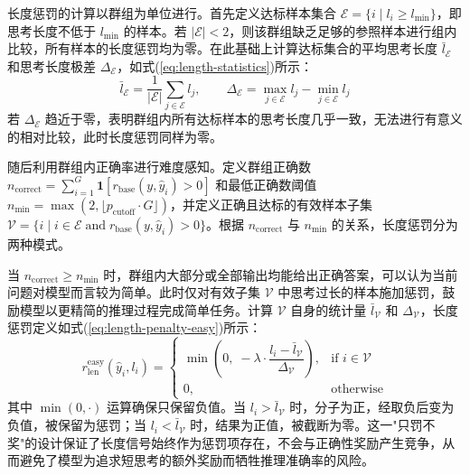 长度惩罚的计算以群组为单位进行。首先定义达标样本集合 $\mathcal{E} = \{i \mid l_i \geq l_{\min}\}$，即思考长度不低于 $l_{\min}$ 的样本。若 $|\mathcal{E}| < 2$，则该群组缺乏足够的参照样本进行组内比较，所有样本的长度惩罚均为零。在此基础上计算达标集合的平均思考长度 $\bar{l}_{\mathcal{E}}$ 和思考长度极差 $\Delta_{\mathcal{E}}$，如式(\ref{eq:length-statistics})所示：
\begin{equation}\label{eq:length-statistics}
  \bar{l}_{\mathcal{E}} = \frac{1}{|\mathcal{E}|}\sum_{j \in \mathcal{E}} l_j, \qquad
  \Delta_{\mathcal{E}} = \max_{j \in \mathcal{E}} l_j - \min_{j \in \mathcal{E}} l_j
\end{equation}
若 $\Delta_{\mathcal{E}}$ 趋近于零，表明群组内所有达标样本的思考长度几乎一致，无法进行有意义的相对比较，此时长度惩罚同样为零。

随后利用群组内正确率进行难度感知。定义群组正确数 $n_{\text{correct}} = \sum_{i=1}^{G} \mathbf{1}[r_{\text{base}}(y, \hat{y}_i) > 0]$ 和最低正确数阈值 $n_{\min} = \max(2, \lfloor p_{\text{cutoff}} \cdot G \rfloor)$，并定义正确且达标的有效样本子集 $\mathcal{V} = \{i \mid i \in \mathcal{E} \;\text{and}\; r_{\text{base}}(y, \hat{y}_i) > 0\}$。根据 $n_{\text{correct}}$ 与 $n_{\min}$ 的关系，长度惩罚分为两种模式。

当 $n_{\text{correct}} \geq n_{\min}$ 时，群组内大部分或全部输出均能给出正确答案，可以认为当前问题对模型而言较为简单。此时仅对有效子集 $\mathcal{V}$ 中思考过长的样本施加惩罚，鼓励模型以更精简的推理过程完成简单任务。计算 $\mathcal{V}$ 自身的统计量 $\bar{l}_{\mathcal{V}}$ 和 $\Delta_{\mathcal{V}}$，长度惩罚定义如式(\ref{eq:length-penalty-easy})所示：
\begin{equation}\label{eq:length-penalty-easy}
  r_{\text{len}}^{\text{easy}}(\hat{y}_i, l_i) =
  \begin{cases}
    \min\!\left(0,\; -\lambda \cdot \dfrac{l_i - \bar{l}_{\mathcal{V}}}{\Delta_{\mathcal{V}}}\right), & \text{if } i \in \mathcal{V} \\
    0, & \text{otherwise}
  \end{cases}
\end{equation}
其中 $\min(0, \cdot)$ 运算确保只保留负值。当 $l_i > \bar{l}_{\mathcal{V}}$ 时，分子为正，经取负后变为负值，被保留为惩罚；当 $l_i < \bar{l}_{\mathcal{V}}$ 时，结果为正值，被截断为零。这一"只罚不奖"的设计保证了长度信号始终作为惩罚项存在，不会与正确性奖励产生竞争，从而避免了模型为追求短思考的额外奖励而牺牲推理准确率的风险。

